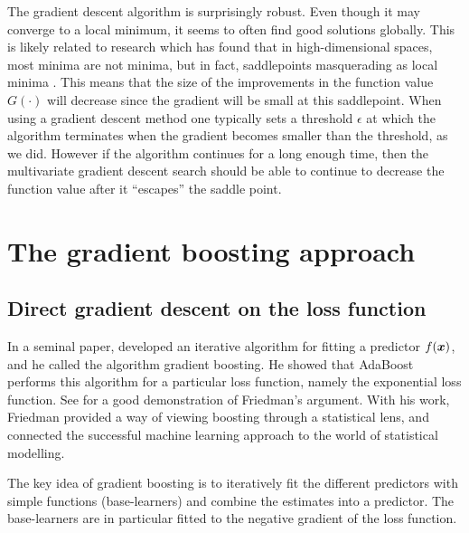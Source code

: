 The gradient descent algorithm is surprisingly robust.
Even though it may converge to a local minimum, it seems to often find good solutions globally.
This is likely related to research which has found that in high-dimensional spaces, most minima are not minima, but in fact, saddlepoints masquerading as local minima \citep{saddlepoints}.
This means that the size of the improvements in the function value $G(\cdot)$ will decrease since the gradient will be small at this saddlepoint.
When using a gradient descent method one typically sets a threshold $\epsilon$ at which the algorithm terminates when the gradient becomes smaller than the threshold, as we did.
However if the algorithm continues for a long enough time, then the multivariate gradient descent search should be able to continue to decrease the function value after it ``escapes'' the saddle point.



\section{The gradient boosting approach}
\subsection{Direct gradient descent on the loss function}
In a seminal paper, \citet{friedman2001} developed an iterative algorithm for fitting a predictor $f(\bm{x})$, and he called the algorithm gradient boosting.
He showed that AdaBoost performs this algorithm for a particular loss function, namely the exponential loss function.
See \citet{ESL} for a good demonstration of Friedman's argument.
With his work, Friedman provided a way of viewing boosting through a statistical lens, and connected the successful machine learning approach to the world of statistical modelling.

The key idea of gradient boosting is to iteratively fit the different predictors with simple functions (base-learners) and combine the estimates into a predictor.
The base-learners are in particular fitted to the negative gradient of the loss function.

